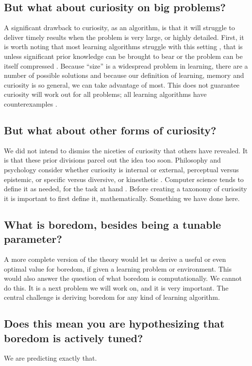 \subsection*{But what about curiosity on big problems?}
A significant drawback to curiosity, as an algorithm, is that it will struggle to deliver timely results when the problem is very large, or highly detailed. First, it is worth noting that most learning algorithms struggle with this setting \citep{MacKay2003,Sutton2018}, that is unless significant prior knowledge can be brought to bear \citep{Zhang2020,Sutton2018} or the problem can be itself compressed \citep{Ha2018a,Fister2019}. Because ``size'' is a widespread problem in learning, there are a number of possible solutions and because our definition of learning, memory and curiosity is so general, we can take advantage of most. This does not guarantee curiosity will work out for all problems; all learning algorithms have counterexamples \citep{Wolpert1997}. 


\subsection*{But what about other forms of curiosity?}
We did not intend to dismiss the niceties of curiosity that others have revealed. It is that these prior divisions parcel out the idea too soon. Philosophy and psychology consider whether curiosity is internal or external, perceptual versus epistemic, or specific versus diversive, or kinesthetic \citep{Kidd2015,Berlyne1950,Zhou2020}. Computer science tends to define it as needed, for the task at hand \citep{Stanley2004,Friston2016,Lehman2011a,Lehman2013,Mouret2015,Colas2020}. Before creating a taxonomy of curiosity it is important to first define it, mathematically. Something we have done here.


\subsection*{What is boredom, besides being a tunable parameter?}
A more complete version of the theory would let us derive a useful or even optimal value for boredom, if given a learning problem or environment. This would also answer the question of what boredom is computationally. We cannot do this. It is a next problem we will work on, and it is very important. The central challenge is deriving boredom for any kind of learning algorithm.


\subsection*{Does this mean you are hypothesizing that boredom is actively tuned?}
We are predicting exactly that.


